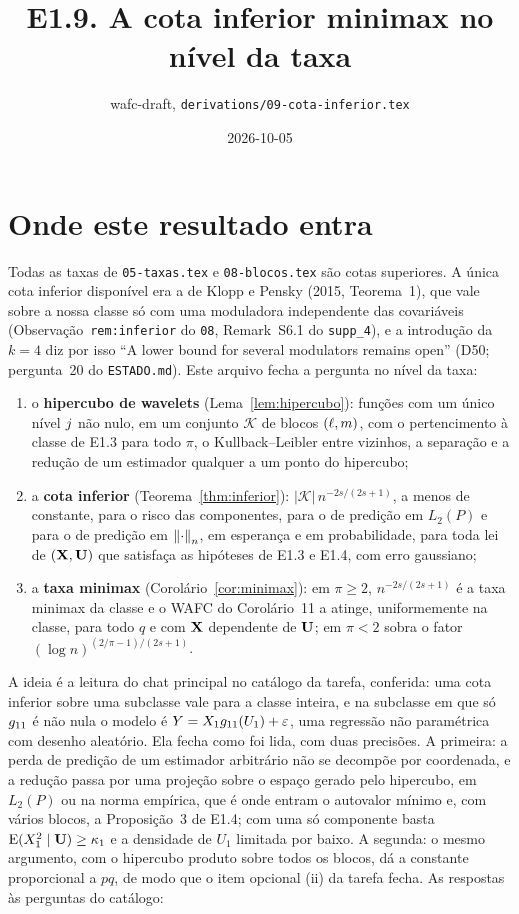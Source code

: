 \documentclass[11pt,a4paper]{article}
\title{E1.9. A cota inferior minimax no nível da taxa}
\author{wafc-draft, \texttt{derivations/09-cota-inferior.tex}}
\date{2026-10-05}
\newcommand{\Kcal}{\mathcal{K}}
\begin{document}
\maketitle

\section*{Onde este resultado entra}

Todas as taxas de \texttt{05-taxas.tex} e \texttt{08-blocos.tex} são cotas
superiores. A única cota inferior disponível era a de Klopp e Pensky (2015,
Teorema~1), que vale sobre a nossa classe só com uma moduladora independente
das covariáveis (Observação~\texttt{rem:inferior} do \texttt{08}, Remark~S6.1
do \texttt{supp\_4}), e a introdução da $k = 4$ diz por isso ``A lower bound
for several modulators remains open'' (D50; pergunta~20 do \texttt{ESTADO.md}).
Este arquivo fecha a pergunta no nível da taxa:

\begin{enumerate}[label=(\alph*), leftmargin=*, nosep]
  \item o \textbf{hipercubo de wavelets} (Lema~\ref{lem:hipercubo}): funções
    com um único nível $j$ não nulo, em um conjunto $\Kcal$ de blocos
    $(\ell,m)$, com o pertencimento à classe de E1.3 para todo $\pi$, o
    Kullback--Leibler entre vizinhos, a separação e a redução de um
    estimador qualquer a um ponto do hipercubo;
  \item a \textbf{cota inferior} (Teorema~\ref{thm:inferior}):
    $|\Kcal|\,n^{-2s/(2s+1)}$, a menos de constante, para o risco das
    componentes, para o de predição em $L_{2}(P)$ e para o de predição em
    $\left\lVert \cdot \right\rVert_{n}$, em esperança e em probabilidade, para toda lei de
    $(\mathbf{X},\mathbf{U})$ que satisfaça as hipóteses de E1.3 e E1.4, com erro
    gaussiano;
  \item a \textbf{taxa minimax} (Corolário~\ref{cor:minimax}): em $\pi \ge 2$,
    $n^{-2s/(2s+1)}$ é a taxa minimax da classe e o WAFC do Corolário~11 a
    atinge, uniformemente na classe, para todo $q$ e com $\mathbf{X}$ dependente de
    $\mathbf{U}$; em $\pi < 2$ sobra o fator $(\log n)^{(2/\pi-1)/(2s+1)}$.
\end{enumerate}

A ideia é a leitura do chat principal no catálogo da tarefa, conferida: uma
cota inferior sobre uma subclasse vale para a classe inteira, e na subclasse
em que só $g_{11}$ é não nula o modelo é $Y = X_{1}g_{11}(U_{1}) +
\varepsilon$, uma regressão não paramétrica com desenho aleatório. Ela fecha
como foi lida, com duas precisões. A primeira: a perda de predição de um
estimador arbitrário não se decompõe por coordenada, e a redução passa por
uma projeção sobre o espaço gerado pelo hipercubo, em $L_{2}(P)$ ou na norma
empírica, que é onde entram o autovalor mínimo e, com vários blocos, a
Proposição~3 de E1.4; com uma só componente basta $\mathrm{E}(X_{1}^{2}\mid\mathbf{U}) \ge
\kappa_{1}$ e a densidade de $U_{1}$ limitada por baixo. A segunda: o mesmo
argumento, com o hipercubo produto sobre todos os blocos, dá a constante
proporcional a $pq$, de modo que o item opcional (ii) da tarefa fecha. As
respostas às perguntas do catálogo:
\end{document}
